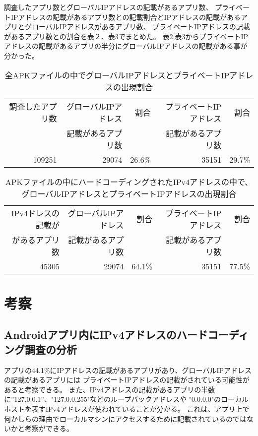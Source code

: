 \documentclass[a4j]{jarticle}
\begin{document}
調査したアプリ数とグローバルIPアドレスの記載があるアプリ数、
プライベートIPアドレスの記載があるアプリ数との記載割合とIPアドレスの記載があるアプリとグローバルIPアドレスがあるアプリ数、
プライベートIPアドレスの記載があるアプリ数との割合を表２、表3でまとめた。
表2,表3からプライベートIPアドレスの記載があるアプリの半分にグローバルIPアドレスの記載がある事が分かった。

\begin{table}[htb]
\begin{center}
	\caption{全APKファイルの中でグローバルIPアドレスとプライベートIPアドレスの出現割合}
	\begin{tabular}{|r|r|r|r|r|}

	\hline
	調査したアプリ数 & グローバルIPアドレス & 割合 & プライベートIPアドレス&割合 \\
	&記載があるアプリ数 & &記載があるアプリ数 &\\
	\hline
		109251 & 29074 & 26.6\% & 35151&29.7\% \\
	\hline
	\end{tabular}
	\end{center}
\end{table}

\begin{table}[htb]
	\begin{center}
		\caption{APKファイルの中にハードコーディングされたIPv4アドレスの中で、グローバルIPアドレスとプライベートIPアドレスの出現割合}
		\begin{tabular}{|r|r|r|r|r|}
	
		\hline
		IPv4ドレスの記載が& グローバルIPアドレス & 割合 & プライベートIPアドレス&割合 \\
		があるアプリ数&記載があるアプリ数 & &記載があるアプリ数 &\\
		\hline
			45305 & 29074 & 64.1\% & 35151&77.5\% \\
		\hline
		\end{tabular}
		\end{center}
	\end{table}


\newpage
\section{考察}
\subsection{Androidアプリ内にIPv4アドレスのハードコーディング調査の分析}
アプリの44.1\%にIPアドレスの記載があるアプリがあり、グローバルIPアドレスの記載があるアプリには
プライベートIPアドレスの記載がされている可能性があると考察できる。
また、IPv4アドレスの記載があるアプリの半数に”127.0.0.1”、"127.0.0.255"などのループバックアドレスや
"0.0.0.0"のローカルホストを表すIPv4アドレスが使われていることが分かる。
これは、アプリ上で何かしらの理由でローカルマシンにアクセスするために記載されているのではないかと考察ができる。
\end{document}
